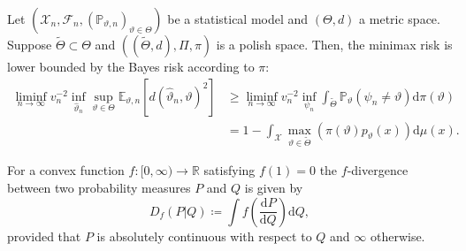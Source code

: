 \documentclass[a4paper]{article}
\begin{document}
\begin{propositionrep}
Let $(\mathcal{X}_n, \mathcal{F}_n, (\mathbb{P}_{\vartheta,n})_{\vartheta \in \Theta})$ be a statistical model and $(\Theta,d)$ a metric space. Suppose $\tilde{\Theta}\subset \Theta$ and $((\tilde{\Theta},d), \Pi, \pi)$ is a polish space. Then, the minimax risk is lower bounded by the Bayes risk according to $\pi$:
\begin{equation*}
\begin{aligned}
\liminf_{n \rightarrow \infty} v_n^{-2} \inf_{\hat{\vartheta}_n} \sup_{\vartheta \in \Theta} \mathbb{E}_{\vartheta,n}[d(\hat{\vartheta}_{n}, \vartheta)^{2}] &\geq \liminf_{n \rightarrow \infty} v_n^{-2} \inf_{\psi_n} \int_{\tilde{\Theta}} \mathbb{P}_{\vartheta}(\psi_n \neq \vartheta) \mathrm{d}\pi(\vartheta)\\
&=1-\int_{\mathcal{X}}\max_{\vartheta \in \tilde{\Theta}} (\pi(\vartheta)p_{\vartheta}(x))\mathrm{d}\mu(x). 
\end{aligned}
\end{equation*}
\end{propositionrep}
\begin{definition}
For a convex function $f:[0,\infty) \rightarrow \mathbb{R}$ satisfying $f(1)=0$ the $f$-divergence between two probability measures $P$ and $Q$ is given by
\begin{equation*}
D_f(P | Q) \coloneqq \int f \left(\frac{\mathrm{d}P}{\mathrm{d}Q}\right)\mathrm{d}Q,
\end{equation*}
provided that $P$ is absolutely continuous with respect to $Q$ and $\infty$ otherwise. 
\end{definition}







\end{document}
